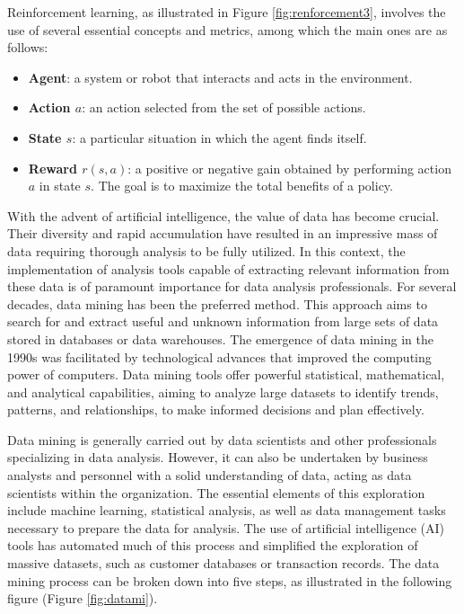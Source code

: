 Reinforcement learning, as illustrated in Figure \ref{fig:renforcement3}, involves the use of several essential concepts and metrics, among which the main ones are as follows:

\begin{itemize}
	\item \textbf{Agent}: a system or robot that interacts and acts in the environment.
	\item \textbf{Action \( a \)}: an action selected from the set of possible actions.
	\item \textbf{State \( s \)}: a particular situation in which the agent finds itself.
	\item \textbf{Reward \( r(s,a) \)}: a positive or negative gain obtained by performing action \( a \) in state \( s \). The goal is to maximize the total benefits of a policy.
\end{itemize}


With the advent of artificial intelligence, the value of data has become crucial. Their diversity and rapid accumulation have resulted in an impressive mass of data requiring thorough analysis to be fully utilized. In this context, the implementation of analysis tools capable of extracting relevant information from these data is of paramount importance for data analysis professionals. For several decades, data mining has been the preferred method. This approach aims to search for and extract useful and unknown information from large sets of data stored in databases or data warehouses. The emergence of data mining in the 1990s was facilitated by technological advances that improved the computing power of computers. Data mining tools offer powerful statistical, mathematical, and analytical capabilities, aiming to analyze large datasets to identify trends, patterns, and relationships, to make informed decisions and plan effectively.


Data mining is generally carried out by data scientists and other professionals specializing in data analysis. However, it can also be undertaken by business analysts and personnel with a solid understanding of data, acting as data scientists within the organization. The essential elements of this exploration include machine learning, statistical analysis, as well as data management tasks necessary to prepare the data for analysis. The use of artificial intelligence (AI) tools has automated much of this process and simplified the exploration of massive datasets, such as customer databases or transaction records. The data mining process can be broken down into five steps, as illustrated in the following figure (Figure \ref{fig:datami}).

